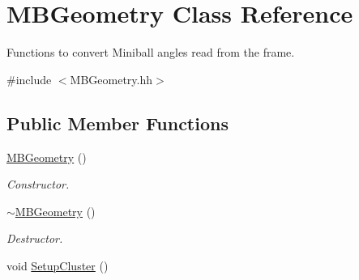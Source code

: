 \hypertarget{class_m_b_geometry}{\section{M\-B\-Geometry Class Reference}
\label{class_m_b_geometry}
}


Functions to convert Miniball angles read from the frame.  




{\ttfamily \#include $<$M\-B\-Geometry.\-hh$>$}

\subsection*{Public Member Functions}
\begin{DoxyCompactItemize}
\item 
\hypertarget{class_m_b_geometry_a47eba401cd9bb4452df2f812c6a7e446}{\hyperlink{class_m_b_geometry_a47eba401cd9bb4452df2f812c6a7e446}{M\-B\-Geometry} ()}\label{class_m_b_geometry_a47eba401cd9bb4452df2f812c6a7e446}

\begin{DoxyCompactList}\small\item\em Constructor. \end{DoxyCompactList}\item 
\hypertarget{class_m_b_geometry_a6359b9d13d3b062ac2153087fc1b172b}{\hyperlink{class_m_b_geometry_a6359b9d13d3b062ac2153087fc1b172b}{$\sim$\-M\-B\-Geometry} ()}\label{class_m_b_geometry_a6359b9d13d3b062ac2153087fc1b172b}

\begin{DoxyCompactList}\small\item\em Destructor. \end{DoxyCompactList}\item 
\hypertarget{class_m_b_geometry_a4d98a38f0dc1ca6a4a73477dde5cdd8d}{void \hyperlink{class_m_b_geometry_a4d98a38f0dc1ca6a4a73477dde5cdd8d}{Setup\-Cluster} ()}\label{class_m_b_geometry_a4d98a38f0dc1ca6a4a73477dde5cdd8d}


\end{DoxyCompactItemize}
